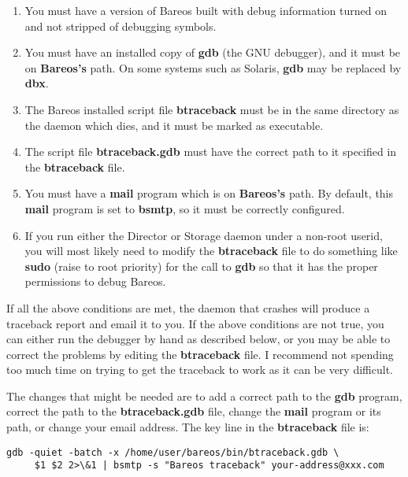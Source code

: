 \begin{enumerate}
\item You must have a version of Bareos built with debug information turned
   on and not stripped of debugging symbols.

\item You must have an installed copy of {\bf gdb} (the GNU debugger),  and it
   must be on {\bf Bareos's} path. On some systems such as Solaris, {\bf
   gdb} may be replaced by {\bf dbx}.

\item The Bareos installed script file {\bf btraceback} must  be in the same
   directory as the daemon which dies, and it must  be marked as executable.

\item The script file {\bf btraceback.gdb} must  have the correct  path to it
   specified in the {\bf btraceback} file.

\item You must have a {\bf mail} program which is on {\bf Bareos's}  path.
   By default, this {\bf mail} program is set to {\bf bsmtp}, so it must
   be correctly configured.

\item If you run either the Director or Storage daemon under a non-root
   userid, you will most likely need to modify the {\bf btraceback} file
   to do something like {\bf sudo} (raise to root priority) for the
   call to {\bf gdb} so that it has the proper permissions to debug
   Bareos.
\end{enumerate}

If all the above conditions are met, the daemon that crashes will produce a
traceback report and email it to you. If the above conditions are not true,
you can either run the debugger by hand as described below, or you may be able
to correct the problems by editing the {\bf btraceback} file. I recommend not
spending too much time on trying to get the traceback to work as it can be
very difficult.

The changes that might be needed are to add a correct path to the {\bf gdb}
program, correct the path to the {\bf btraceback.gdb} file, change the {\bf
mail} program or its path, or change your email address. The key line in the
{\bf btraceback} file is:

\footnotesize
\begin{verbatim}
gdb -quiet -batch -x /home/user/bareos/bin/btraceback.gdb \
     $1 $2 2>\&1 | bsmtp -s "Bareos traceback" your-address@xxx.com
\end{verbatim}
\normalsize

